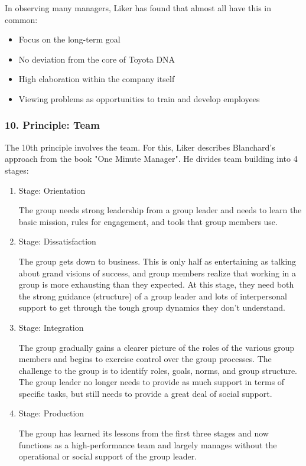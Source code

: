\documentclass[a4paper,11pt]{article}
\begin{document}
In observing many managers, Liker has found that almost all have this in common:

\begin{itemize}
\item Focus on the long-term goal
\item No deviation from the core of Toyota DNA
\item High elaboration within the company itself
\item Viewing problems as opportunities to train and develop employees
\end{itemize}

\subsubsection*{10. Principle: Team}

The 10th principle involves the team. For this, Liker describes Blanchard's
approach from the book "One Minute Manager". He divides team building into 4
stages:

\begin{enumerate}
\item Stage: Orientation
  
  The group needs strong leadership from a group leader and needs to learn the
  basic mission, rules for engagement, and tools that group members use.
\item Stage: Dissatisfaction

  The group gets down to business. This is only half as entertaining as
  talking about grand visions of success, and group members realize that
  working in a group is more exhausting than they expected. At this stage,
  they need both the strong guidance (structure) of a group leader and lots of
  interpersonal support to get through the tough group dynamics they don't
  understand.
\item Stage: Integration

  The group gradually gains a clearer picture of the roles of the various
  group members and begins to exercise control over the group processes. The
  challenge to the group is to identify roles, goals, norms, and group
  structure. The group leader no longer needs to provide as much support in
  terms of specific tasks, but still needs to provide a great deal of social
  support.
\item Stage: Production

  The group has learned its lessons from the first three stages and now
  functions as a high-performance team and largely manages without the
  operational or social support of the group leader.
\end{enumerate}
\end{document}
